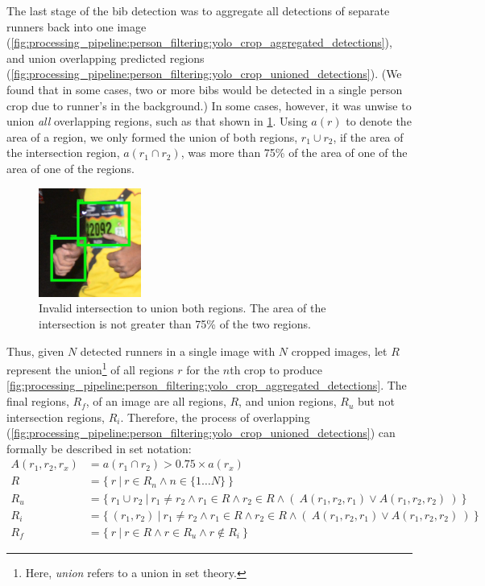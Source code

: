 The last stage of the bib detection was to aggregate all detections of separate runners back into one image (\cref{fig:processing_pipeline:person_filtering:yolo_crop_aggregated_detections}), and union overlapping predicted regions (\cref{fig:processing_pipeline:person_filtering:yolo_crop_unioned_detections}). (We found that in some cases, two or more bibs would be detected in a single person crop due to runner's in the background.) In some cases, however, it was unwise to union \textit{all} overlapping regions, such as that shown in \cref{fig:processing_pipeline:hand}. Using $a(r)$ to denote the area of a region, we only formed the union of both regions, $r_{1} \cup r_{2}$, if the area of the intersection region, $a(r_{1} \cap r_{2})$, was more than 75\% of the area of one of the area of one of the regions.

\begin{figure}[h]
  \centering
  \includegraphics[width=0.3\textwidth]{images/processing/hand}
  \caption[Invalid intersection to union both regions]{Invalid intersection to union both regions. The area of the intersection is not greater than 75\% of the two regions.}
  \label{fig:processing_pipeline:hand}
\end{figure}

Thus, given $N$ detected runners in a single image with $N$ cropped images, let $R$ represent the union\footnote{Here, \textit{union} refers to a union in set theory.} of all regions $r$ for the $n$th crop to produce \cref{fig:processing_pipeline:person_filtering:yolo_crop_aggregated_detections}. The final regions, $R_{f}$, of an image are all regions, $R$, and union regions, $R_{u}$ but not intersection regions, $R_{i}$. Therefore, the process of overlapping (\cref{fig:processing_pipeline:person_filtering:yolo_crop_unioned_detections}) can formally be described in set notation:
\begin{align*}
A(r_{1}, r_{2}, r_{x}) &= a(r_{1} \cap r_{2}) > 0.75 \times a(r_{x})\\
R &= \{\ r\ |\ r \in R_{n} \wedge n \in \{ 1 \dots N \}\ \}\\
R_{u} &= \{\ r_{1} \cup r_{2}\ |\ r_{1} \neq r_{2} \wedge r_{1} \in R \wedge r_{2} \in R \wedge (\ A(r_{1}, r_{2}, r_{1}) \vee A(r_{1}, r_{2}, r_{2})\ )\ \}\\
R_{i} &= \{\ (r_{1}, r_{2})\ |\ r_{1} \neq r_{2} \wedge r_{1} \in R \wedge r_{2} \in R \wedge (\ A(r_{1}, r_{2}, r_{1}) \vee A(r_{1}, r_{2}, r_{2})\ )\ \}\\
R_{f} &= \{\ r\ |\ r \in R \wedge r \in R_{u} \wedge r \not\in R_{i}\ \}
\end{align*}

